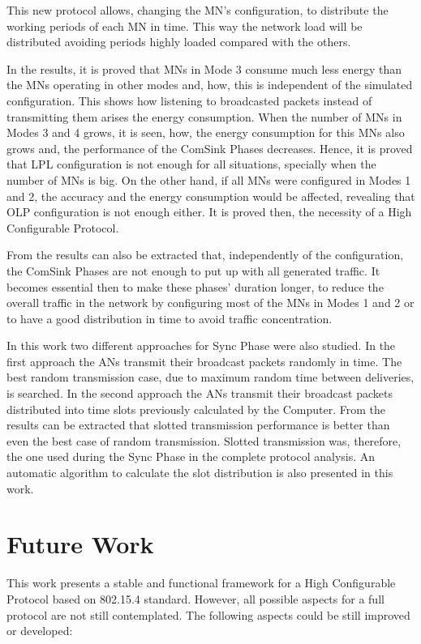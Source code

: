 This new protocol allows, changing the \ac{MN}'s configuration, to distribute the working periods of each \ac{MN} in time. This way the network
load will be distributed avoiding periods highly loaded compared with the others.

In the results, it is proved that \acp{MN} in Mode 3 consume much less energy than the \acp{MN} operating in other modes and, how,
this is independent of the simulated configuration. This shows how listening to broadcasted packets instead of transmitting them arises
the energy consumption. When the number of \acp{MN} in Modes 3 and 4 grows, it is seen, how, the energy consumption 
for this \acp{MN} also grows and, the performance of the ComSink Phases decreases. Hence, it is proved that \ac{LPL} configuration is not enough
for all situations, specially when the number of \acp{MN} is big. On the other hand, if all \acp{MN} were configured in Modes 1 and 2, the accuracy
and the energy consumption would be affected, revealing that \ac{OLP} configuration is not enough either. It is proved then, the necessity of
a High Configurable Protocol.

From the results can also be extracted that, independently of the configuration, the ComSink Phases are not enough to put up with all generated 
traffic. It becomes essential then to make these phases' duration longer, to reduce the overall traffic in the network by configuring most of 
the \acp{MN} in Modes 1 and 2 or to have a good distribution in time to avoid traffic concentration.

In this work two different approaches for Sync Phase were also studied. In the first approach the \acp{AN} transmit their broadcast packets randomly
in time. The best random transmission case, due to maximum random time between deliveries, is searched. In the second approach the \acp{AN} transmit
their broadcast packets distributed into time slots previously calculated by the Computer. From the results can be extracted that slotted 
transmission performance is better than even the best case of random transmission. Slotted transmission was, therefore, the one used during 
the Sync Phase in the complete protocol analysis. An automatic algorithm to calculate the slot distribution is also presented in this work.


\section{Future Work}

This work presents a stable and functional framework for a High Configurable Protocol based on 802.15.4 standard. However, all possible aspects
for a full protocol are not still contemplated. The following aspects could be still improved or developed:

